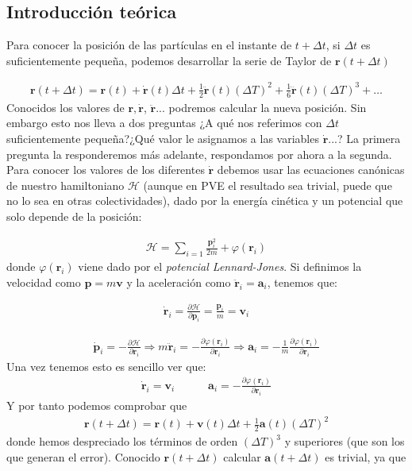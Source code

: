 \documentclass[11pt]{article} %
\newcommand{\parciales}[2]{\frac{\partial #1}{\partial #2}}
\newcommand{\tquad}{\quad \quad \quad}
\newcommand{\Hcal}{\mathcal{H}}
\newcommand{\an}{\mathbf{a}}
\newcommand{\pn}{\mathbf{p}}
\newcommand{\rn}{\mathbf{r}}
\newcommand{\vn}{\mathbf{v}}
\begin{document}
\subsection{Introducción teórica}

Para conocer la posición de las partículas en el instante de $t + \Delta t$, si $\Delta t$ es suficientemente pequeña, podemos desarrollar la serie de Taylor de $\rn(t+\Delta t)$

\begin{eqnarray}
	\rn(t+\Delta t) = \rn (t) + \dot{\rn} (t) \Delta t + \frac{1}{2} \ddot{\rn} (t) (\Delta T)^2 + \frac{1}{6} \dddot{\rn} (t) (\Delta T)^3 + \ldots
\end{eqnarray}
Conocidos los valores de $\rn,\dot{\rn}$, $\ddot{\rn}...$ podremos calcular la nueva posición. Sin embargo esto nos lleva a dos preguntas ¿A qué nos referimos con $\Delta t$ suficientemente pequeña?¿Qué valor le asignamos a las variables $\dot{\rn}...$? La primera pregunta la responderemos más adelante, respondamos por ahora a la segunda. Para conocer los valores de los diferentes $\dot{\rn}$ debemos usar las ecuaciones canónicas de nuestro hamiltoniano  $\Hcal$ (aunque en PVE el resultado sea trivial, puede que no lo sea en otras colectividades), dado por la energía cinética y un potencial que solo depende de la posición:

\begin{eqnarray}
	\Hcal = \sum_{i=1} \frac{\pn_i^2}{2m} + \varphi (\rn_i)
\end{eqnarray}
donde $\varphi(\rn_i)$ viene dado por el \textit{potencial Lennard-Jones}. Si definimos la velocidad como $\pn=m\vn$ y la aceleración como $\ddot{\rn}_i = \an_i$, tenemos que:

\begin{eqnarray}
	\dot{\rn}_i = \parciales{\Hcal}{\pn_i} = \frac{\pn_i}{m} = \vn_i
\end{eqnarray}

\begin{eqnarray}
	\dot{\pn}_i = - \parciales{\Hcal}{\rn_i} \Rightarrow  m \ddot{\rn}_i = - \parciales{\varphi(\rn_i)}{\rn_i} \Rightarrow \an_i =  - \frac{1}{m} \parciales{\varphi(\rn_i)}{\rn_i}
\end{eqnarray}
Una vez tenemos esto es sencillo ver que:
\begin{eqnarray}
	\dot{\rn}_i = \vn_i \tquad \an_i = - \parciales{\varphi(\rn_i)}{\rn_i}
\end{eqnarray}
Y por tanto podemos comprobar que 
\begin{eqnarray}
	\rn(t+\Delta t) = \rn(t) + \vn(t) \Delta t + \frac{1}{2} \an (t) (\Delta T)^2
\end{eqnarray}
donde hemos despreciado los términos de orden $(\Delta T)^3$ y superiores (que son los que generan el error). Conocido  $\rn(t+\Delta t)$ calcular $\an(t+\Delta t)$ es trivial, ya que 
\end{document}
